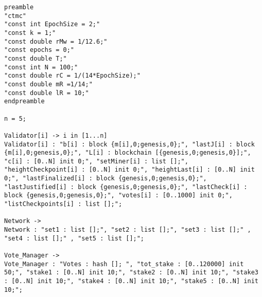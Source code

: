\begin{lstlisting}[style=chor-color,caption={Choreographic language for the Hybrid Casper Protocol.},captionpos=b,label={ex5-code}]
preamble
"ctmc"
"const int EpochSize = 2;"
"const k = 1;"
"const double rMw = 1/12.6;"
"const epochs = 0;"
"const double T;"
"const int N = 100;"
"const double rC = 1/(14*EpochSize);"
"const double mR =1/14;"
"const double lR = 10;"
endpreamble
	
n = 5;
	
Validator[i] -> i in [1...n]
Validator[i] : "b[i] : block {m[i],0;genesis,0};", "lastJ[i] : block {m[i],0;genesis,0};", "L[i] : blockchain [{genesis,0;genesis,0}];", "c[i] : [0..N] init 0;", "setMiner[i] : list [];", "heightCheckpoint[i] : [0..N] init 0;", "heightLast[i] : [0..N] init 0;", "lastFinalized[i] : block {genesis,0;genesis,0};", "lastJustified[i] : block {genesis,0;genesis,0};", "lastCheck[i] : block {genesis,0;genesis,0};", "votes[i] : [0..1000] init 0;", "listCheckpoints[i] : list [];";
	
Network ->
Network : "set1 : list [];", "set2 : list [];", "set3 : list [];" , "set4 : list [];" , "set5 : list [];";
		
Vote_Manager -> 
Vote_Manager : "Votes : hash []; ", "tot_stake : [0..120000] init 50;", "stake1 : [0..N] init 10;", "stake2 : [0..N] init 10;", "stake3 : [0..N] init 10;", "stake4 : [0..N] init 10;", "stake5 : [0..N] init 10;";
	

\end{lstlisting}
